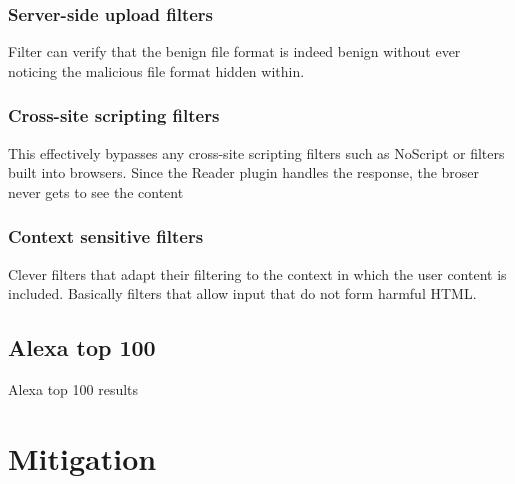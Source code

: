 \documentclass[10pt, conference, compsocconf]{IEEEtran}
\begin{document}
\subsubsection{Server-side upload filters}

Filter can verify that the benign file format is indeed benign 
without ever noticing the malicious file format hidden within.


\subsubsection{Cross-site scripting filters}

This effectively bypasses any cross-site scripting filters such as 
NoScript or filters built into browsers. Since the Reader plugin 
handles the response, the broser never gets to see the content


\subsubsection{Context sensitive filters}

Clever filters that adapt their filtering to the context in which 
the user content is included. Basically filters that allow input 
that do not form harmful HTML. 


\subsection{Alexa top 100}

Alexa top 100 results











\section{Mitigation}
\end{document}
